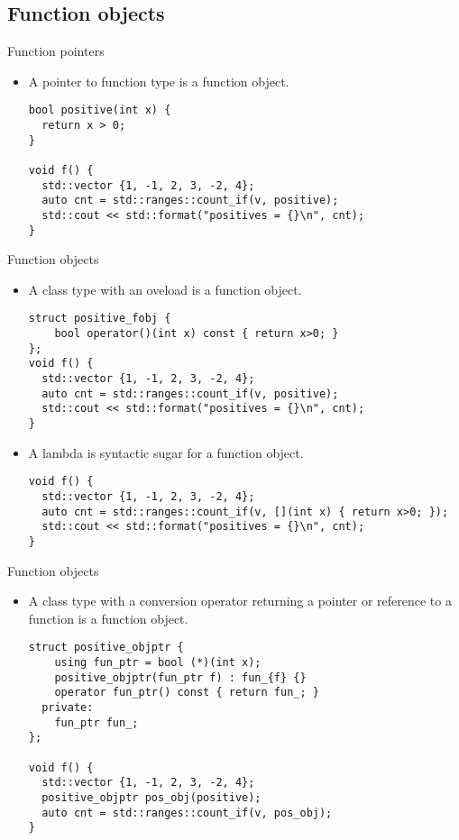 \subsection{Function objects}

\begin{frame}[t,fragile]{Function pointers}
\begin{itemize}
   \item A pointer to function type is a function object.
\begin{lstlisting}
bool positive(int x) { 
  return x > 0; 
}

void f() {
  std::vector {1, -1, 2, 3, -2, 4};
  auto cnt = std::ranges::count_if(v, positive);
  std::cout << std::format("positives = {}\n", cnt);
}
\end{lstlisting}
\end{itemize}
\end{frame}

\begin{frame}[t,fragile]{Function objects}
\begin{itemize}
  \item A class type with an  oveload is a function object.
\begin{lstlisting}
struct positive_fobj {
    bool operator()(int x) const { return x>0; }
};
void f() {
  std::vector {1, -1, 2, 3, -2, 4};
  auto cnt = std::ranges::count_if(v, positive);
  std::cout << std::format("positives = {}\n", cnt);
}
\end{lstlisting}

  \item A lambda is syntactic sugar for a function object.
\begin{lstlisting}
void f() {
  std::vector {1, -1, 2, 3, -2, 4};
  auto cnt = std::ranges::count_if(v, [](int x) { return x>0; });
  std::cout << std::format("positives = {}\n", cnt);
}
\end{lstlisting}

\end{itemize}
\end{frame}

\begin{frame}[t,fragile]{Function objects}
\begin{itemize}
  \item A class type with a conversion operator returning a pointer or reference
        to a function is a function object.
\begin{lstlisting}
struct positive_objptr {
    using fun_ptr = bool (*)(int x);
    positive_objptr(fun_ptr f) : fun_{f} {}
    operator fun_ptr() const { return fun_; }
  private:
    fun_ptr fun_;
};

void f() {
  std::vector {1, -1, 2, 3, -2, 4};
  positive_objptr pos_obj(positive);
  auto cnt = std::ranges::count_if(v, pos_obj);
}
\end{lstlisting}

\end{itemize}
\end{frame}
